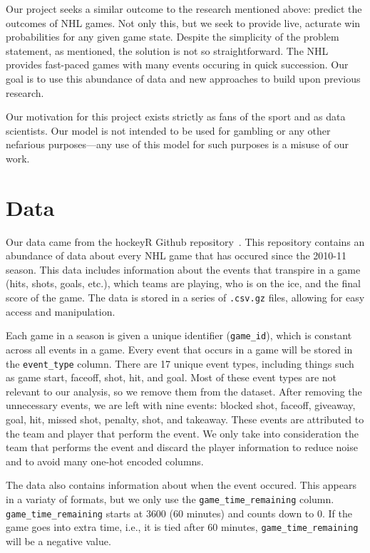 \documentclass[11pt]{article}
\begin{document}
Our project seeks a similar outcome to the research mentioned above: predict the outcomes of NHL games. Not only this,
but we seek to provide live, acturate win probabilities for any given game state. Despite the simplicity of the problem statement, 
as mentioned, the solution is not so straightforward. The NHL provides fast-paced games with many events
occuring in quick succession. Our goal is to use this abundance of data and new approaches to build upon previous research.

Our motivation for this project exists strictly as fans of the sport and as data scientists. Our model is not intended to be used for gambling or any other
nefarious purposes—any use of this model for such purposes is a misuse of our work.

\section{Data}
Our data came from the hockeyR Github repository~\cite{hockeyR-data}. This repository contains an abundance of data about every NHL game
that has occured since the 2010-11 season. This data includes information about the events that transpire in a game (hits, shots, goals, etc.),
which teams are playing, who is on the ice, and the final score of the game. The data is stored in a series of {\tt .csv.gz} files, allowing for
easy access and manipulation.

Each game in a season is given a unique identifier ({\tt game\_id}), which is constant across all events in a game. Every event that occurs in a game
will be stored in the {\tt event\_type} column. There are 17 unique event types, including things such as game start, faceoff, shot, hit, and goal.
Most of these event types are not relevant to our analysis, so we remove them from the dataset. After removing the unnecessary events, we are left with
nine events: blocked shot, faceoff, giveaway, goal, hit, missed shot, penalty, shot, and takeaway. These events are attributed to the
team and player that perform the event. We only take into consideration the team that performs the event and discard the player information to reduce noise and to avoid many one-hot encoded columns.

The data also contains information about when the event occured. This appears in a variaty of formats, but we only
use the {\tt game\_time\_remaining} column. {\tt game\_time\_remaining} starts
at 3600 (60 minutes) and counts down to 0. If the game goes into extra time, i.e., it is tied after 60 minutes, {\tt game\_time\_remaining} will
be a negative value.
\end{document}
